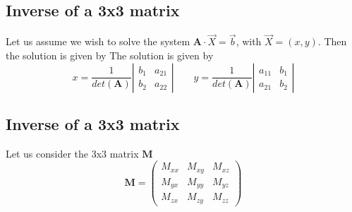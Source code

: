 \subsection{Inverse of a 3x3 matrix \label{sec:inv2x2}}

Let us assume we wish to solve the 
system $\bm A \cdot \vec X = \vec b$, with $\vec X=(x,y)$. Then the solution is given by
The solution is given by
\[
x=\frac{1}{det(\bm A)}
\left|
\begin{array}{cc}
b_1 & a_{21} \\
b_2 & a_{22}
\end{array}
\right|
\qquad
y=\frac{1}{det(\bm A)}
\left|
\begin{array}{cc}
a_{11} & b_1\\
a_{21} & b_2
\end{array}
\right|
\]



\subsection{Inverse of a 3x3 matrix \label{sec:inv3x3}}

Let us consider the 3x3 matrix ${\bm M}$
\[
{\bm M}=
\left(
\begin{array}{ccc}
M_{xx} & M_{xy} & M_{xz} \\
M_{yx} & M_{yy} & M_{yz} \\
M_{zx} & M_{zy} & M_{zz} 
\end{array}
\right)
\]

